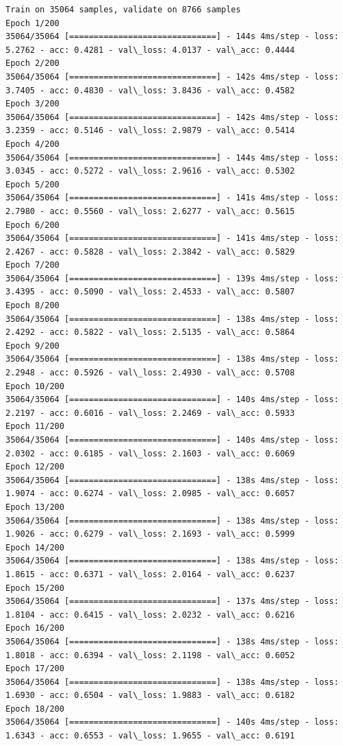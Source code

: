 \documentclass[11pt]{article}
\begin{document}
    \begin{Verbatim}[commandchars=\\\{\}]
Train on 35064 samples, validate on 8766 samples
Epoch 1/200
35064/35064 [==============================] - 144s 4ms/step - loss: 5.2762 - acc: 0.4281 - val\_loss: 4.0137 - val\_acc: 0.4444
Epoch 2/200
35064/35064 [==============================] - 142s 4ms/step - loss: 3.7405 - acc: 0.4830 - val\_loss: 3.8436 - val\_acc: 0.4582
Epoch 3/200
35064/35064 [==============================] - 142s 4ms/step - loss: 3.2359 - acc: 0.5146 - val\_loss: 2.9879 - val\_acc: 0.5414
Epoch 4/200
35064/35064 [==============================] - 144s 4ms/step - loss: 3.0345 - acc: 0.5272 - val\_loss: 2.9616 - val\_acc: 0.5302
Epoch 5/200
35064/35064 [==============================] - 141s 4ms/step - loss: 2.7980 - acc: 0.5560 - val\_loss: 2.6277 - val\_acc: 0.5615
Epoch 6/200
35064/35064 [==============================] - 141s 4ms/step - loss: 2.4267 - acc: 0.5828 - val\_loss: 2.3842 - val\_acc: 0.5829
Epoch 7/200
35064/35064 [==============================] - 139s 4ms/step - loss: 3.4395 - acc: 0.5090 - val\_loss: 2.4533 - val\_acc: 0.5807
Epoch 8/200
35064/35064 [==============================] - 138s 4ms/step - loss: 2.4292 - acc: 0.5822 - val\_loss: 2.5135 - val\_acc: 0.5864
Epoch 9/200
35064/35064 [==============================] - 138s 4ms/step - loss: 2.2948 - acc: 0.5926 - val\_loss: 2.4930 - val\_acc: 0.5708
Epoch 10/200
35064/35064 [==============================] - 140s 4ms/step - loss: 2.2197 - acc: 0.6016 - val\_loss: 2.2469 - val\_acc: 0.5933
Epoch 11/200
35064/35064 [==============================] - 140s 4ms/step - loss: 2.0302 - acc: 0.6185 - val\_loss: 2.1603 - val\_acc: 0.6069
Epoch 12/200
35064/35064 [==============================] - 138s 4ms/step - loss: 1.9074 - acc: 0.6274 - val\_loss: 2.0985 - val\_acc: 0.6057
Epoch 13/200
35064/35064 [==============================] - 138s 4ms/step - loss: 1.9026 - acc: 0.6279 - val\_loss: 2.1693 - val\_acc: 0.5999
Epoch 14/200
35064/35064 [==============================] - 138s 4ms/step - loss: 1.8615 - acc: 0.6371 - val\_loss: 2.0164 - val\_acc: 0.6237
Epoch 15/200
35064/35064 [==============================] - 137s 4ms/step - loss: 1.8104 - acc: 0.6415 - val\_loss: 2.0232 - val\_acc: 0.6216
Epoch 16/200
35064/35064 [==============================] - 138s 4ms/step - loss: 1.8018 - acc: 0.6394 - val\_loss: 2.1198 - val\_acc: 0.6052
Epoch 17/200
35064/35064 [==============================] - 138s 4ms/step - loss: 1.6930 - acc: 0.6504 - val\_loss: 1.9883 - val\_acc: 0.6182
Epoch 18/200
35064/35064 [==============================] - 140s 4ms/step - loss: 1.6343 - acc: 0.6553 - val\_loss: 1.9655 - val\_acc: 0.6191

\end{Verbatim}
\end{document}
